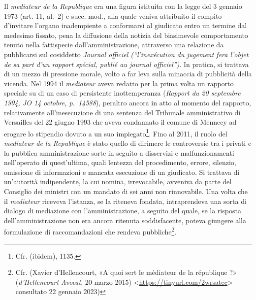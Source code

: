 \documentclass[12pt,it,a4paper,]{report}
\begin{document}
Il \emph{mediateur de la Republique} era una figura istituita con la
legge del 3 gennaio 1973 (art. 11, al.~2) e succ. mod., alla quale
veniva attribuito il compito d'invitare l'organo inadempiente a
conformarsi al giudicato entro un termine dal medesimo fissato, pena la
diffusione della notizia del biasimevole comportamento tenuto nella
fattispecie dall'amministrazione, attraverso una relazione da
pubblicarsi sul cosiddetto \emph{Journal officiel (``l'inexécution du
jugement fera l'objet de sa part d'un rapport spécial, publié au journal
officiel'')}. In pratica, si trattava di un mezzo di pressione morale,
volto a far leva sulla minaccia di pubblicità della vicenda. Nel 1994 il
\emph{mediateur} aveva redatto per la prima volta un rapporto speciale
su di un caso di persistente inottemperanza (\emph{Rapport du 20
septembre 1994, JO 14 octobre, p.~14588}), peraltro ancora in atto al
momento del rapporto, relativamente all'inesecuzione di una sentenza del
Tribunale amministrativo di Versailles del 22 giugno 1993 che aveva
condannato il comune di Mennecy ad erogare lo stipendio dovuto a un suo
impiegato\footnote{Cfr. (ibidem), 1135.}. Fino al 2011, il ruolo del
\emph{mediateur de la Republique} è stato quello di dirimere le
controversie tra i privati e la pubblica amministrazione sorte in
seguito a disservizi e malfunzionamenti nell'operato di quest'ultima,
quali lentezza del procedimento, errore, silenzio, omissione di
informazioni e mancata esecuzione di un giudicato. Si trattava di
un'autorità indipendente, la cui nomina, irrevocabile, avveniva da parte
del Consiglio dei ministri con un mandato di sei anni non rinnovabile.
Una volta che il \emph{mediateur} riceveva l'istanza, se la riteneva
fondata, intraprendeva una sorta di dialogo di mediazione con
l'amministrazione, a seguito del quale, se la risposta
dell'amministrazione non era ancora ritenuta soddisfacente, poteva
giungere alla formulazione di raccomandazioni che rendeva
pubbliche\footnote{Cfr. (Xavier d'Hellencourt, {«A quoi sert le
  médiateur de la république ?»} (\emph{d'Hellencourt Avocat}, 20 marzo
  2015) \textless{}\url{https://tinyurl.com/2wrsatec}\textgreater{}
  consultato 22 gennaio 2023)}.
\end{document}
